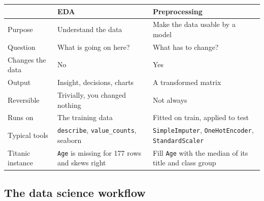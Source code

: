 \documentclass[11pt,a4paper]{article}
\begin{document}
\begin{tabularx}{\textwidth}{@{}lXX@{}}
\toprule
\rowcolor{tablehead} & \textbf{EDA} & \textbf{Preprocessing} \\
\midrule
Purpose & Understand the data & Make the data usable by a model \\
Question & What is going on here? & What has to change? \\
Changes the data & No & Yes \\
Output & Insight, decisions, charts & A transformed matrix \\
Reversible & Trivially, you changed nothing & Not always \\
Runs on & The training data & Fitted on train, applied to test \\
Typical tools & \lstinline|describe|, \lstinline|value_counts|, seaborn & \lstinline|SimpleImputer|, \lstinline|OneHotEncoder|, \lstinline|StandardScaler| \\
Titanic instance & \texttt{Age} is missing for 177 rows and skews right & Fill \texttt{Age} with the median of its title and class group \\
\bottomrule
\end{tabularx}



\subsection{The data science workflow}

\end{document}
